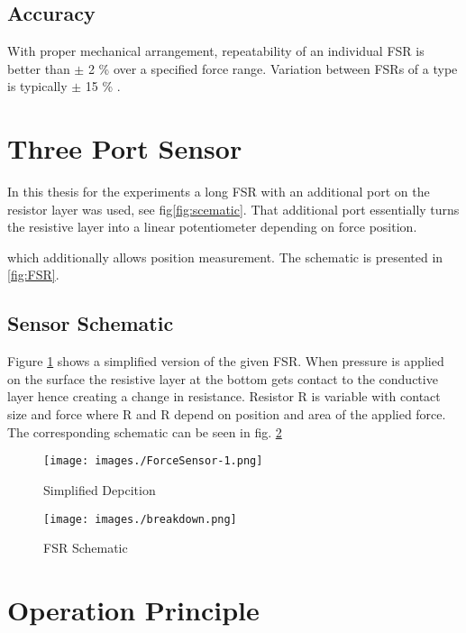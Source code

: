 \subsection{Accuracy}
\label{subsection:accuracy}
With proper mechanical arrangement, repeatability of an individual FSR is better than $\pm$ 2 \% over a specified force range. Variation between FSRs of a type is typically $\pm$ 15 \% \cite{yaniger1991force}. 




\section{Three Port Sensor}
In this thesis for the experiments a long FSR with an additional port on the resistor layer was used, see fig\ref{fig:scematic}. That additional port essentially turns the resistive layer into a linear potentiometer depending on force position.

which additionally allows position measurement. The schematic is presented in \ref{fig:FSR}.

\subsection{Sensor Schematic}
Figure \ref{fig:simplified} shows a simplified version of the given FSR. When pressure is applied on the surface the resistive layer at the bottom gets contact to the conductive layer hence creating a change in resistance. Resistor R is variable with contact size and force where R and R depend on position and area of the applied force. The corresponding schematic can be seen in fig. \ref{fig:schematic}



\begin{figure}[htp]
    \centering
    \texttt{[image: images./ForceSensor-1.png]}
    \caption[FSR simplified]{Simplified Depcition}
    \label{fig:simplified}
\end{figure}  

\begin{figure}[htp]
    \centering
    \texttt{[image: images./breakdown.png]}
    \caption[FSR Schematic]{FSR Schematic}
    \label{fig:schematic}
\end{figure}  

\section{Operation Principle}
